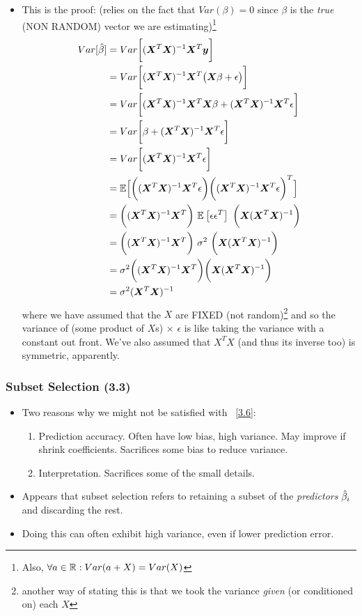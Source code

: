 \documentclass[11pt]{article}
\begin{document}
\begin{itemize}
	\item This is the proof: (relies on the fact that $Var(\beta) = 0$ since $\beta$ is the \emph{true} (NON RANDOM) vector we are estimating)\footnote{Also, $\forall a \in \mathbb{R}: Var(a + X) = Var(X)$}
	\begin{align}
	Var[\hat{\beta}] &= Var\bigg[ (\bm{X}_{}^T \bm{X}_{})^{-1} \bm{X}_{}^T \bm{y}_{}	\bigg] \\
	&= Var\bigg[ (\bm{X}_{}^T \bm{X}_{})^{-1} \bm{X}_{}^T \big( \bm{X}_{} \beta + \epsilon  \big)	\bigg] \\
	&= Var\bigg[ (\bm{X}_{}^T \bm{X}_{})^{-1} \bm{X}_{}^T  \bm{X}_{} \beta +  (\bm{X}_{}^T \bm{X}_{})^{-1} \bm{X}_{}^T \epsilon  	\bigg] \\
	&= Var\bigg[ \beta +  (\bm{X}_{}^T \bm{X}_{})^{-1} \bm{X}_{}^T \epsilon  	\bigg] \\
	&= Var\bigg[ (\bm{X}_{}^T \bm{X}_{})^{-1} \bm{X}_{}^T \epsilon  	\bigg] \\
	&= \mathbb{E}\Big[	\bigg( 	(\bm{X}_{}^T \bm{X}_{})^{-1} \bm{X}_{}^T \epsilon	\bigg) \bigg(	(\bm{X}_{}^T \bm{X}_{})^{-1} \bm{X}_{}^T \epsilon \bigg)^T	\Big] \\
	&= 	\bigg( 	(\bm{X}_{}^T \bm{X}_{})^{-1} \bm{X}_{}^T  \bigg)  ~ \mathbb{E}_{}\left[\epsilon\epsilon^T\right] ~ \bigg( \bm{X}_{} 	(\bm{X}_{}^T \bm{X}_{})^{-1}   \bigg)	\\
	&= 	\bigg( 	(\bm{X}_{}^T \bm{X}_{})^{-1} \bm{X}_{}^T  \bigg)  ~ \sigma^2 ~ \bigg( \bm{X}_{} 	(\bm{X}_{}^T \bm{X}_{})^{-1}   \bigg)	 \\
	&= \sigma^2	\bigg( 	(\bm{X}_{}^T \bm{X}_{})^{-1} \bm{X}_{}^T  \bigg)  \bigg( \bm{X}_{} 	(\bm{X}_{}^T \bm{X}_{})^{-1}   \bigg)	 \\
	&= \sigma^2	 	(\bm{X}_{}^T \bm{X}_{})^{-1}
	\end{align}
	where we have assumed that the $X$ are FIXED (not random)\footnote{another way of stating this is that we took the variance \emph{given} (or conditioned on) each $X$} and so the variance of (some product of $X$s) $\times$ $\epsilon$ is like taking the variance with a constant out front. We've also assumed that $X^T X$ (and thus its inverse too) is symmetric, apparently. 
\end{itemize}

\subsubsection{Subset Selection (3.3)}
\begin{itemize}
	\item Two reasons why we might not be satisfied with ~\ref{3.6}:
	\begin{enumerate}
		\item Prediction accuracy. Often have low bias, high variance. May improve if shrink coefficients. Sacrifices some bias to reduce variance. 
		\item Interpretation. Sacrifices some of the small details.
	\end{enumerate}
	\item Appears that subset selection refers to retaining a subset of the \textit{predictors} $\hat{\beta}_i$ and discarding the rest.
	\item Doing this can often exhibit high variance, even if lower prediction error. 
\end{itemize}
\end{document}
